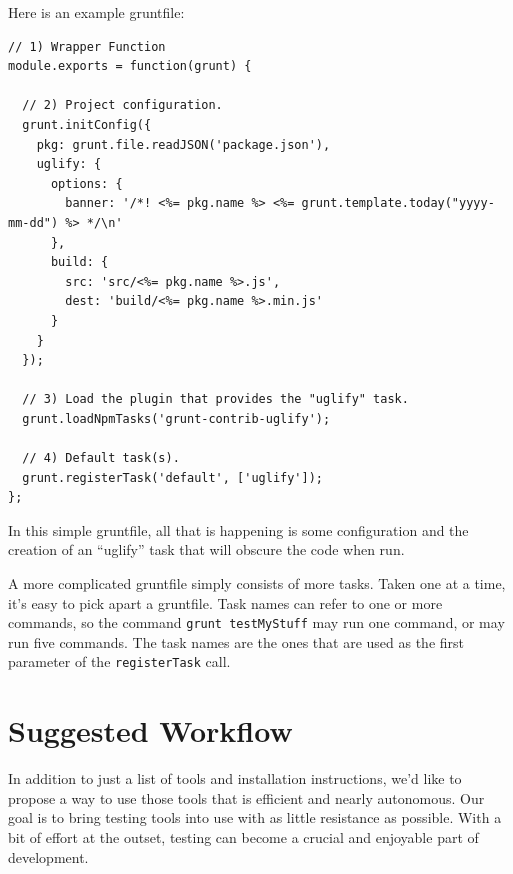 \documentclass[12pt]{ucthesis}
\begin{document}
Here is an example gruntfile:
\begin{lstlisting}
// 1) Wrapper Function
module.exports = function(grunt) {

  // 2) Project configuration.
  grunt.initConfig({
    pkg: grunt.file.readJSON('package.json'),
    uglify: {
      options: {
        banner: '/*! <%= pkg.name %> <%= grunt.template.today("yyyy-mm-dd") %> */\n'
      },
      build: {
        src: 'src/<%= pkg.name %>.js',
        dest: 'build/<%= pkg.name %>.min.js'
      }
    }
  });

  // 3) Load the plugin that provides the "uglify" task.
  grunt.loadNpmTasks('grunt-contrib-uglify');

  // 4) Default task(s).
  grunt.registerTask('default', ['uglify']);
};
\end{lstlisting}

In this simple gruntfile, all that is happening is some configuration and the creation of an ``uglify'' task that will obscure the code when run.

A more complicated gruntfile simply consists of more tasks. Taken one at a time, it's easy to pick apart a gruntfile. Task names can refer to one or more commands, so the command \lstinline{grunt testMyStuff} may run one command, or may run five commands. The task names are the ones that are used as the first parameter of the \lstinline{registerTask} call.

\section{Suggested Workflow}
In addition to just a list of tools and installation instructions, we'd like to propose a way to use those tools that is efficient and nearly autonomous. Our goal is to bring testing tools into use with as little resistance as possible. With a bit of effort at the outset, testing can become a crucial and enjoyable part of development.
\end{document}

